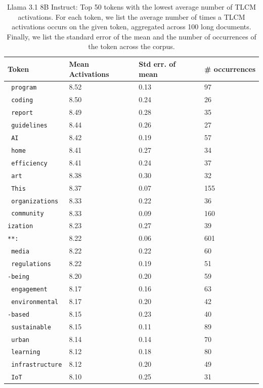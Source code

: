 \begin{table}[h!]
\centering
\caption{Llama 3.1 8B Instruct: Top 50 tokens with the lowest average number of TLCM activations. For each token, we list the average number of times a TLCM activations occurs on the given token, aggregated across 100 long documents. Finally, we list the standard error of the mean and the number of occurrences of the token across the corpus.}
\label{table:token_correction_counts_llama_bottom}
\begin{tabular}{llll}
\toprule
\textbf{Token} & \textbf{Mean Activations} & \textbf{Std err. of mean} & \textbf{\# occurrences} \\
\midrule
\texttt{ program} & 8.52 & 0.13 & 97 \\
\texttt{ coding} & 8.50 & 0.24 & 26 \\
\texttt{ report} & 8.49 & 0.28 & 35 \\
\texttt{ guidelines} & 8.44 & 0.26 & 27 \\
\texttt{ AI} & 8.42 & 0.19 & 57 \\
\texttt{ home} & 8.41 & 0.27 & 34 \\
\texttt{ efficiency} & 8.41 & 0.24 & 37 \\
\texttt{ art} & 8.38 & 0.30 & 32 \\
\texttt{ This} & 8.37 & 0.07 & 155 \\
\texttt{ organizations} & 8.33 & 0.22 & 36 \\
\texttt{ community} & 8.33 & 0.09 & 160 \\
\texttt{ization} & 8.23 & 0.27 & 39 \\
\texttt{**:} & 8.22 & 0.06 & 601 \\
\texttt{ media} & 8.22 & 0.22 & 60 \\
\texttt{ regulations} & 8.22 & 0.19 & 51 \\
\texttt{-being} & 8.20 & 0.20 & 59 \\
\texttt{ engagement} & 8.17 & 0.16 & 63 \\
\texttt{ environmental} & 8.17 & 0.20 & 42 \\
\texttt{-based} & 8.15 & 0.23 & 40 \\
\texttt{ sustainable} & 8.15 & 0.11 & 89 \\
\texttt{ urban} & 8.14 & 0.14 & 70 \\
\texttt{ learning} & 8.12 & 0.18 & 80 \\
\texttt{ infrastructure} & 8.12 & 0.20 & 49 \\
\texttt{ IoT} & 8.10 & 0.25 & 31 \\

\end{tabular}
\end{table}
